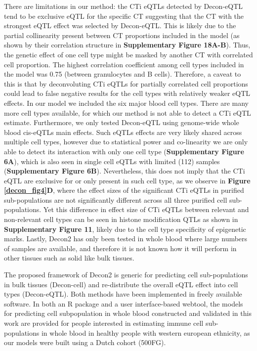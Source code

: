 There are limitations in our method: the CTi eQTLs detected by Decon-eQTL tend to be exclusive eQTL for the specific CT suggesting that the CT with the strongest eQTL effect was selected by Decon-eQTL. This is  likely due to the partial collinearity present between CT proportions included in the model (as shown by their correlation structure in \textbf{Supplementary Figure 18A-B}). Thus, the genetic effect of one cell type might be masked by another CT with correlated cell proportion. The highest correlation coefficient among cell types included in the model was 0.75 (between granulocytes and B cells). Therefore, a caveat to this is that by deconvoluting CTi eQTLs for partially correlated cell proportions could lead to false negative results for the cell types with relatively weaker eQTL effects. 
In our model we included the six major blood cell types. There are many more cell types available, for which our method is not able to detect a CTi eQTL estimate. Furthermore, we only tested Decon-eQTL using genome-wide whole blood cis-eQTLs main effects. Such eQTLs effects are very likely shared across multiple cell types, however due to statistical power and co-linearity we are only able to detect its interaction with only one cell type (\textbf{Supplementary Figure 6A}), which is also seen in single cell eQTLs with limited (112) samples (\textbf{Supplementary Figure 6B}). Nevertheless, this does not imply that the CTi eQTL are exclusive for or only present in such cell type, as we observe in \textbf{Figure \ref{decon_fig4}D}, where the effect sizes of the significant CTi eQTLs in purified sub-populations are not significantly different across all three purified cell sub-populations. Yet this difference in effect size of CTi eQTLs between relevant and non-relevant cell types can be seen in histone modification QTLs as shown in \textbf{Supplementary Figure 11}, likely due to the cell type specificity of epigenetic marks. Lastly, Decon2 has only been tested in whole blood where large numbers of samples are available, and therefore it is not known how it will perform in other tissues such as solid like bulk tissues.

The proposed framework of Decon2 is generic for predicting cell sub-populations in bulk tissues (Decon-cell) and re-distribute the overall eQTL effect into cell types (Decon-eQTL). Both methods have been implemented in freely available software. In both an R package and a user interface-based webtool, the models for predicting cell subpopulation in whole blood constructed and validated in this work are provided for people interested in estimating immune cell sub-populations in whole blood in healthy people with western european ethnicity, as our models were built using a Dutch cohort (500FG). 

